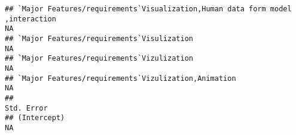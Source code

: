\documentclass[]{article}
\begin{document}
\begin{verbatim}
## `Major Features/requirements`Visualization,Human data form model ,interaction                                                                                                                                                                                                                                                                                                                                                                                                         NA
## `Major Features/requirements`Visulization                                                                                                                                                                                                                                                                                                                                                                                                                                             NA
## `Major Features/requirements`Vizulization                                                                                                                                                                                                                                                                                                                                                                                                                                             NA
## `Major Features/requirements`Vizulization,Animation                                                                                                                                                                                                                                                                                                                                                                                                                                   NA
##                                                                                                                                                                                                                                                                                                                                                                                                                                                                                 Std. Error
## (Intercept)                                                                                                                                                                                                                                                                                                                                                                                                                                                                             NA

\end{verbatim}
\end{document}
